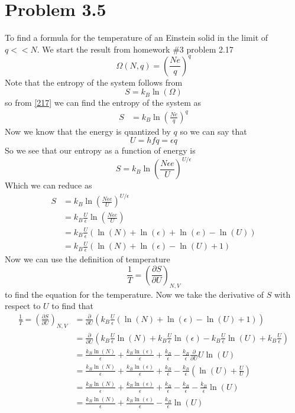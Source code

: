 \documentclass[11pt]{article}
\numberwithin{equation}{section}
\begin{document}


\section{Problem 3.5}
To find a formula for the temperature of an Einstein solid in the limit of $q<<N$. We start the result from homework \#3 problem 2.17
\begin{equation}
\Omega(N,q) = \left(\frac{Ne}{q}\right)^{q}
\label{217}
\end{equation}
Note that the entropy of the system follows from 
$$S = k_B\ln(\Omega)$$
so from \ref{217} we can find the entropy of the system as
\begin{align*}
S &= k_B\ln\left(\frac{Ne}{q}\right)^{q}
\end{align*}
Now we know that the energy is quantized by $q$ so we can say that
$$U = hfq = \epsilon q$$
So we see that our entropy as a function of energy is 
$$S = k_B\ln\left(\frac{N\epsilon e}{U}\right)^{U/\epsilon}$$
Which we can reduce as
\begin{align*}
S &= k_B\ln\left(\frac{N\epsilon e}{U}\right)^{U/\epsilon}\\
&= k_B\frac{U}{\epsilon}\ln\left(\frac{N\epsilon e}{U}\right)\\
&= k_B\frac{U}{\epsilon}\left(\ln(N)+\ln(\epsilon)+\ln(e)-\ln(U)\right)\\
&= k_B\frac{U}{\epsilon}\left(\ln(N)+\ln(\epsilon)-\ln(U) + 1\right)
\end{align*}
Now we can use the definition of temperature
$$\frac{1}{T} = \left(\frac{\partial S}{\partial U}\right)_{N,V}$$
to find the equation for the temperature. Now we take the derivative of $S$ with respect to $U$ to find that
\begin{align*}
\frac{1}{T} = \left(\frac{\partial S}{\partial U}\right)_{N,V} &= \frac{\partial}{\partial U}\left(k_B\frac{U}{\epsilon}\left(\ln(N)+\ln(\epsilon)-\ln(U) + 1\right)\right)\\
&= \frac{\partial}{\partial U}\left(k_B\frac{U}{\epsilon}\ln(N)+k_B\frac{U}{\epsilon}\ln(\epsilon)-k_B\frac{U}{\epsilon}\ln(U) + k_B\frac{U}{\epsilon}\right)\\
&= \frac{k_B\ln(N)}{\epsilon}+\frac{k_B\ln(\epsilon)}{\epsilon} + \frac{k_B}{\epsilon}-\frac{k_B}{\epsilon}\frac{\partial}{\partial U}U\ln(U)\\
&= \frac{k_B\ln(N)}{\epsilon}+\frac{k_B\ln(\epsilon)}{\epsilon} + \frac{k_B}{\epsilon}-\frac{k_B}{\epsilon}\left(\ln(U) + \frac{U}{U}\right)\\
&= \frac{k_B\ln(N)}{\epsilon}+\frac{k_B\ln(\epsilon)}{\epsilon} + \frac{k_B}{\epsilon} - \frac{k_B}{\epsilon} - \frac{k_B}{\epsilon}\ln(U)\\
&= \frac{k_B\ln(N)}{\epsilon}+\frac{k_B\ln(\epsilon)}{\epsilon} - \frac{k_B}{\epsilon}\ln(U)
\end{align*}
\end{document}
